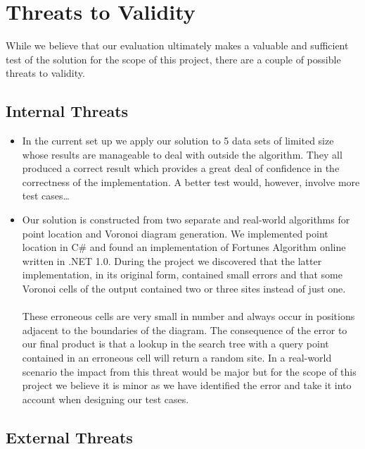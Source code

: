 
\section{Threats to Validity}

While we believe that our evaluation ultimately makes a valuable and sufficient test of the solution for the scope of this project, there are a couple of possible threats to validity.

\subsection{Internal Threats}

\begin{itemize}
	\item In the current set up we apply our solution to 5 data sets of limited size whose results are manageable to deal with outside the algorithm. They all produced a correct result which provides a great deal of confidence in the correctness of the implementation. A better test would, however, involve more test cases…

	\item Our solution is constructed from two separate and real-world algorithms for point location and Voronoi diagram generation. We implemented point location in C\# and found an implementation of Fortunes Algorithm online written in .NET 1.0. During the project we discovered that the latter implementation, in its original form, contained small errors and that some Voronoi cells of the output contained two or three sites instead of just one.

\paragraph{}
These erroneous cells are very small in number and always occur in positions adjacent to the boundaries of the diagram. The consequence of the error to our final product is that a lookup in the search tree with a query point contained in an erroneous cell will return a random site. In a real-world scenario the impact from this threat would be major but for the scope of this project we believe it is minor as we have identified the error and take it into account when designing our test cases.
\end{itemize}

\subsection{External Threats}

